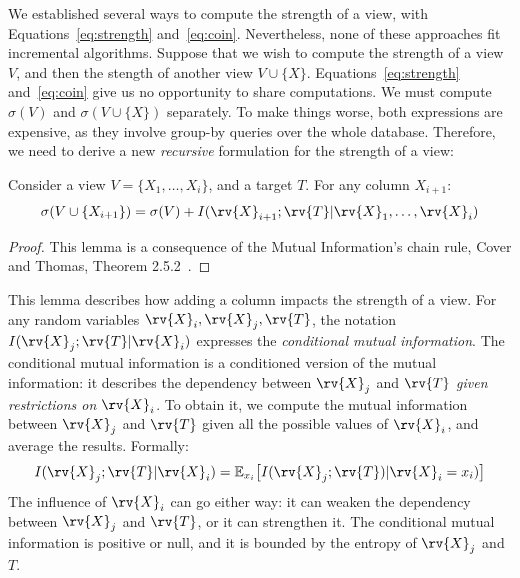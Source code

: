 We established several ways to compute the strength of a view, with
Equations~\ref{eq:strength} and~\ref{eq:coin}. Nevertheless, none of these
approaches fit incremental algorithms.  Suppose that we wish to compute the
strength of a view $V$, and then the stength of another view $V \cup \{X\}$.
Equations~\ref{eq:strength} and~\ref{eq:coin} give us no opportunity to share
computations.  We must compute $\sigma(V)$ and $\sigma(V \cup \{X\})$
separately. To make things worse, both expressions are expensive, as they
involve group-by queries over the whole database. Therefore, we need to derive
a new \emph{recursive} formulation for the strength of a view:
\begin{lemma}\label{lem:chain}
Consider a view $V = \{X_1, \ldots, X_i\}$, and a target $T$.
For any column $X_{i+1}$: 
\begin{equation}\label{eq:bonus}
    \sigma(V \cup \{X_{i+1}\}) =  \sigma(V) + I(\rv{X}_{i+1} ; \rv{T} | \rv{X}_1 , \ldots, \rv{X}_i)
\end{equation}
\end{lemma}
\begin{proof}
This lemma is a consequence of the Mutual Information's chain rule,
Cover and Thomas, Theorem 2.5.2~\cite{cover2012elements}.
\end{proof}
This lemma describes how adding a column impacts the strength of a view.  For
any random variables $\rv{X}_i, \rv{X}_j, \rv{T}$, the notation
$I(\rv{X}_j;\rv{T}|\rv{X}_i)$  expresses the \emph{conditional mutual
information}. The conditional mutual information is a conditioned version of
the mutual information: it describes the dependency between $\rv{X}_j$ and
$\rv{T}$ \emph{given restrictions on $\rv{X}_i$}. To obtain it, we compute the
mutual information between $\rv{X}_j$ and $\rv{T}$ given all the possible
values of $\rv{X}_i$, and average the results. Formally:
\begin{equation}\label{eq:condmutinfo}
    I(\rv{X}_j;\rv{T}|\rv{X}_i) = \mathbb{E}_{x_i}\big[ I(\rv{X}_j; \rv{T})| \rv{X}_i = x_i)  \big]
\end{equation}
The influence of $\rv{X}_i$ can go either way: it can weaken the dependency between
$\rv{X}_j$ and $\rv{T}$, or it can strengthen it. The conditional mutual information is
positive or null, and it is bounded by the entropy of $\rv{X}_j$ and $T$. 


